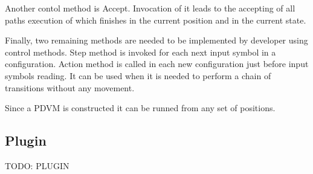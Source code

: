 Another contol method is Accept.
Invocation of it leads to the accepting of all paths execution of which finishes in the current position and in the current state.

Finally, two remaining methods are needed to be implemented by developer using control methods.
Step method is invoked for each next input symbol in a configuration.
Action method is called in each new configuration just before input symbols reading.
It can be used when it is needed to perform a chain of transitions without any movement.

Since a PDVM is constructed it can be runned from any set of positions.

\subsection{Plugin}

TODO: PLUGIN
